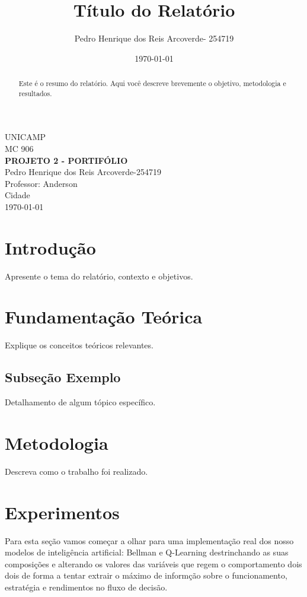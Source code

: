 \documentclass[12pt,a4paper]{article}
\title{Título do Relatório}
\author{Pedro Henrique dos Reis Arcoverde- 254719}
\date{\today}
\begin{document}
\begin{titlepage}
	\centering
	{\large UNICAMP}\\[1.5cm]

	{\Large MC 906}\\[2cm]

	{\Huge \textbf{PROJETO 2 - PORTIFÓLIO}}\\[2cm]

	{\large Pedro Henrique dos Reis Arcoverde-254719}\\[0.5cm]
	{\large Professor: Anderson}\\[2cm]

	{\large Cidade}\\
	{\large \today}
\end{titlepage}

\begin{abstract}
	Este é o resumo do relatório. Aqui você descreve brevemente o objetivo, metodologia e resultados.
\end{abstract}

\tableofcontents
\newpage

\section{Introdução}
Apresente o tema do relatório, contexto e objetivos.

\section{Fundamentação Teórica}
Explique os conceitos teóricos relevantes.

\subsection{Subseção Exemplo}
Detalhamento de algum tópico específico.

\section{Metodologia}
Descreva como o trabalho foi realizado.

\section{Experimentos}
Para esta seção vamos começar a olhar para uma implementação real dos nosso modelos de inteligência artificial:
Bellman e Q-Learning destrinchando as suas composições e alterando os valores das variáveis que regem o comportamento
dois dois de forma a tentar extrair o máximo de informção sobre o funcionamento, estratégia e rendimentos no fluxo de
decisão.
\end{document}
